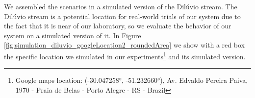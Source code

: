     We assembled the scenarios in a simulated version of the Dilúvio stream. The Dilúvio stream is a potential location for real-world trials of our system due to the fact that it is near of our laboratory, so we evaluate the behavior of our system on a simulated version of it. In Figure \ref{fig:simulation_diluvio_googleLocation2_roundedArea} we show with a red box the specific location we simulated in our experiments\footnote{Google maps location: (-30.047258°, -51.232660°), Av. Edvaldo Pereira Paiva, 1970 - Praia de Belas - Porto Alegre - RS - Brazil} and its simulated version.
     
